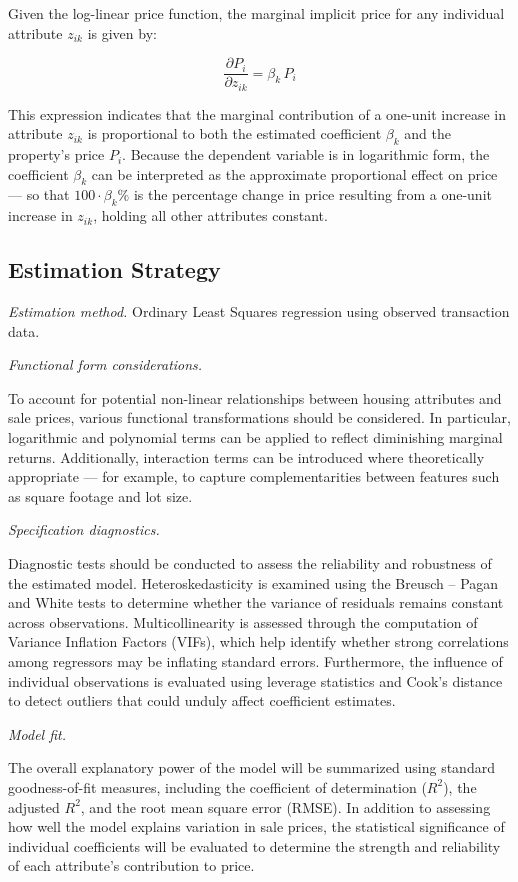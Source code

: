 \documentclass[11pt]{article}
\begin{document}
Given the log-linear price function, the marginal implicit price for any individual attribute $z_{ik}$ is given by:

\[
\frac{\partial P_i}{\partial z_{ik}} = \beta_k \, P_i
\]

This expression indicates that the marginal contribution of a one-unit increase in attribute $z_{ik}$ is proportional to both the estimated coefficient $\beta_k$ and the property's price $P_i$. Because the dependent variable is in logarithmic form, the coefficient $\beta_k$ can be interpreted as the approximate proportional effect on price --- so that $100 \cdot \beta_k \%$ is the percentage change in price resulting from a one-unit increase in $z_{ik}$, holding all other attributes constant.


\subsection{Estimation Strategy}

\textit{Estimation method.} Ordinary Least Squares regression using observed transaction data. 
    
\textit{Functional form considerations.}  

To account for potential non-linear relationships between housing attributes and sale prices, various functional transformations should be considered. In particular, logarithmic and polynomial terms can be applied to reflect diminishing marginal returns. Additionally, interaction terms can be introduced where theoretically appropriate --- for example, to capture complementarities between features such as square footage and lot size.
    
\textit{Specification diagnostics.}

Diagnostic tests should be conducted to assess the reliability and robustness of the estimated model. Heteroskedasticity is examined using the Breusch -- Pagan and White tests to determine whether the variance of residuals remains constant across observations. Multicollinearity is assessed through the computation of Variance Inflation Factors (VIFs), which help identify whether strong correlations among regressors may be inflating standard errors. Furthermore, the influence of individual observations is evaluated using leverage statistics and Cook’s distance to detect outliers that could unduly affect coefficient estimates.
          
\textit{Model fit.} 

The overall explanatory power of the model will be summarized using standard goodness-of-fit measures, including the coefficient of determination ($R^2$), the adjusted $R^2$, and the root mean square error (RMSE). In addition to assessing how well the model explains variation in sale prices, the statistical significance of individual coefficients will be evaluated to determine the strength and reliability of each attribute's contribution to price.
    
\end{document}
